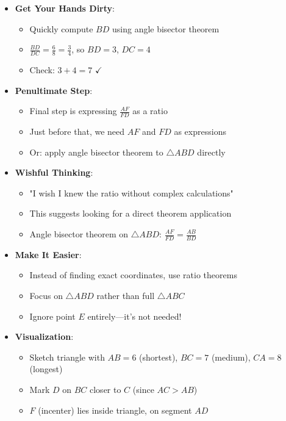 \documentclass[12pt]{article}
\begin{document}
\begin{strategicbox}
\begin{itemize}[leftmargin=*]
    \item \textbf{Get Your Hands Dirty}: 
    \begin{itemize}
        \item Quickly compute $BD$ using angle bisector theorem
        \item $\frac{BD}{DC} = \frac{6}{8} = \frac{3}{4}$, so $BD = 3$, $DC = 4$
        \item Check: $3 + 4 = 7$ $\checkmark$
    \end{itemize}
    
    \item \textbf{Penultimate Step}: 
    \begin{itemize}
        \item Final step is expressing $\frac{AF}{FD}$ as a ratio
        \item Just before that, we need $AF$ and $FD$ as expressions
        \item Or: apply angle bisector theorem to $\triangle ABD$ directly
    \end{itemize}
    
    \item \textbf{Wishful Thinking}: 
    \begin{itemize}
        \item "I wish I knew the ratio without complex calculations"
        \item This suggests looking for a direct theorem application
        \item Angle bisector theorem on $\triangle ABD$: $\frac{AF}{FD} = \frac{AB}{BD}$
    \end{itemize}
    
    \item \textbf{Make It Easier}: 
    \begin{itemize}
        \item Instead of finding exact coordinates, use ratio theorems
        \item Focus on $\triangle ABD$ rather than full $\triangle ABC$
        \item Ignore point $E$ entirely—it's not needed!
    \end{itemize}
    
    \item \textbf{Visualization}: 
    \begin{itemize}
        \item Sketch triangle with $AB = 6$ (shortest), $BC = 7$ (medium), $CA = 8$ (longest)
        \item Mark $D$ on $BC$ closer to $C$ (since $AC > AB$)
        \item $F$ (incenter) lies inside triangle, on segment $AD$
    \end{itemize}
\end{itemize}


\end{strategicbox}
\end{document}
